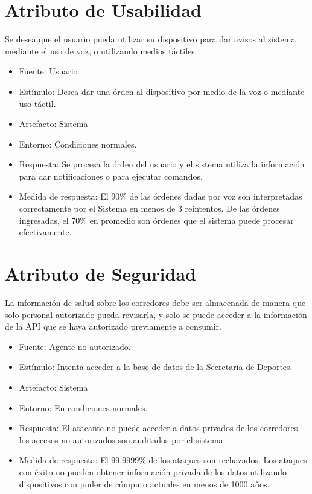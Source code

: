 \section{Atributo de Usabilidad}

Se desea que el usuario pueda utilizar su dispositivo para dar avisos al
sistema mediante el uso de voz, o utilizando medios táctiles.

\begin{itemize}
\itemsep1pt\parskip0pt
\item
  Fuente: Usuario
\item
  Estímulo: Desea dar una órden al dispositivo por medio de la voz o
  mediante uso táctil.
\item
  Artefacto: Sistema
\item
  Entorno: Condiciones normales.
\item
  Respuesta: Se procesa la órden del usuario y el sistema utiliza la
  información para dar notificaciones o para ejecutar comandos.
\item
  Medida de respuesta: El 90\% de las órdenes dadas por voz son
  interpretadas correctamente por el Sistema en menos de 3 reintentos.
  De las órdenes ingresadas, el 70\% en promedio son órdenes que el
  sistema puede procesar efectivamente.
\end{itemize}

\section{Atributo de Seguridad}

La información de salud sobre los corredores debe ser almacenada de
manera que solo personal autorizado pueda revisarla, y solo se puede
acceder a la información de la API que se haya autorizado previamente a
consumir.

\begin{itemize}
\itemsep1pt\parskip0pt
\item
  Fuente: Agente no autorizado.
\item
  Estímulo: Intenta acceder a la base de datos de la Secretaría de
  Deportes.
\item
  Artefacto: Sistema
\item
  Entorno: En condiciones normales.
\item
  Respuesta: El atacante no puede acceder a datos privados de los
  corredores, los accesos no autorizados son auditados por el sistema.
\item
  Medida de respuesta: El 99.9999\% de los ataques son rechazados. Los
  ataques con éxito no pueden obtener información privada de los datos
  utilizando dispositivos con poder de cómputo actuales en menos de 1000
  años.
\end{itemize}

